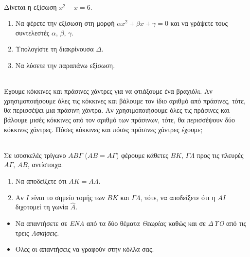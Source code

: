 \documentclass[12pt,a4page]{article}
\begin{document}
\exercisepart
\begin{schltask}[label=\normalsize\bf\letterspace{\defaultletterspace}ΑΣΚΗΣΗ\ \arabic*,itemsep=2ex]
\item \leavevmode\\
  Δίνεται η εξίσωση $x^2 -  x = 6$.\\[-1.2\baselineskip]
  \begin{enumerate}[label=\bf\alph*),leftmargin=20pt]
  \item Να φέρετε την εξίσωση στη μορφή $\alpha x^2 + \beta x + \gamma = 0 $ και να γράψετε τους συντελεστές $\alpha,\,\beta,\,\gamma$.
  \item Υπολογίστε τη διακρίνουσα $\Delta$.
  \item Να λύσετε την παραπάνω εξίσωση.
  \end{enumerate}
\item \leavevmode\\
  Έχουμε κόκκινες και πράσινες χάντρες για να φτιάξουμε ένα βραχιόλι. Αν χρησιμοποιήσουμε όλες τις κόκκινες και βάλουμε τον ίδιο αριθμό από πράσινες, τότε, θα περισσέψει μια πράσινη χάντρα. Αν χρησιμοποιήσουμε όλες τις πράσινες και βάλουμε μισές κόκκινες από τον αριθμό των πράσινων, τότε, θα περισσέψουν δύο κόκκινες χάντρες. Πόσες κόκκινες και πόσες πράσινες χάντρες έχουμε;
\item \leavevmode\\
  Σε ισοσκελές τρίγωνο $AB\Gamma$ ($AB = A\Gamma$) φέρουμε κάθετες $BK,\, \Gamma\Lambda$ προς τις πλευρές  $A\Gamma,\, AB$, αντίστοιχα.\\[-1.2\baselineskip]
\begin{enumerate}[label=\bf \alph*),leftmargin=20pt]
\item Να αποδείξετε ότι $AK = A\Lambda$.
\item Αν $I$ είναι το σημείο τομής των $BK$ και $\Gamma\Lambda$, τότε, να αποδείξετε ότι η $AI$ διχοτομεί τη γωνία $\hat{A}$.
\end{enumerate}
\end{schltask}

\vspace{8ex}

\wish

\vspace{4ex}

\begin{itemize}[leftmargin=10pt]
\item Να απαντήσετε σε \textit{ΕΝΑ} από τα δύο θέματα \textit{Θεωρίας} καθώς και σε
  \textit{ΔΥΟ} από τις τρεις \textit{Ασκήσεις}.
\item Όλες οι απαντήσεις να γραφούν στην κόλλα σας.
\end{itemize}

\vspace{7ex}

\hfill
{}
\end{document}
